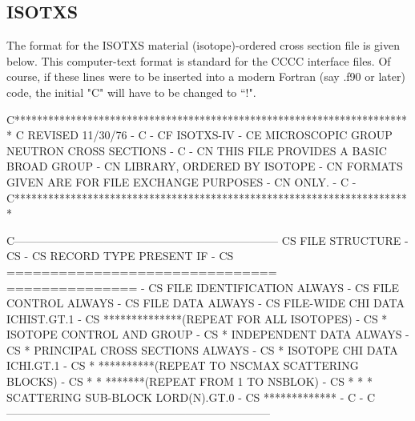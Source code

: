 \subsection{ISOTXS}
\label{ssCCCCR_ISOTXS}

The format for the ISOTXS material (isotope)-ordered
cross section file is given below.  This computer-text format is
standard for the CCCC interface files.  Of course, if these lines
were to be inserted into a modern Fortran (say .f90 or later)
code, the initial "C" will have to be changed to ``!".

\small
\begin{ccode}

C***********************************************************************
C                       REVISED 11/30/76                               -
C                                                                      -
CF          ISOTXS-IV                                                  -
CE          MICROSCOPIC GROUP NEUTRON CROSS SECTIONS                   -
C                                                                      -
CN                      THIS FILE PROVIDES A BASIC BROAD GROUP         -
CN                      LIBRARY, ORDERED BY ISOTOPE                    -
CN                      FORMATS GIVEN ARE FOR FILE EXCHANGE PURPOSES   -
CN                      ONLY.                                          -
C                                                                      -
C***********************************************************************

C-----------------------------------------------------------------------
CS          FILE STRUCTURE                                             -
CS                                                                     -
CS             RECORD TYPE                        PRESENT IF           -
CS             ===============================    ===============      -
CS             FILE IDENTIFICATION                ALWAYS               -
CS             FILE CONTROL                       ALWAYS               -
CS             FILE DATA                          ALWAYS               -
CS             FILE-WIDE CHI DATA                 ICHIST.GT.1          -
CS   **************(REPEAT FOR ALL ISOTOPES)                           -
CS   *         ISOTOPE CONTROL AND GROUP                               -
CS   *                        INDEPENDENT DATA    ALWAYS               -
CS   *         PRINCIPAL CROSS SECTIONS           ALWAYS               -
CS   *         ISOTOPE CHI DATA                   ICHI.GT.1            -
CS   *  **********(REPEAT TO NSCMAX SCATTERING BLOCKS)                 -
CS   *  *  *******(REPEAT FROM 1 TO NSBLOK)                            -
CS   *  *  *   SCATTERING SUB-BLOCK               LORD(N).GT.0         -
CS   *************                                                     -
C                                                                      -
C-----------------------------------------------------------------------


\end{ccode}
